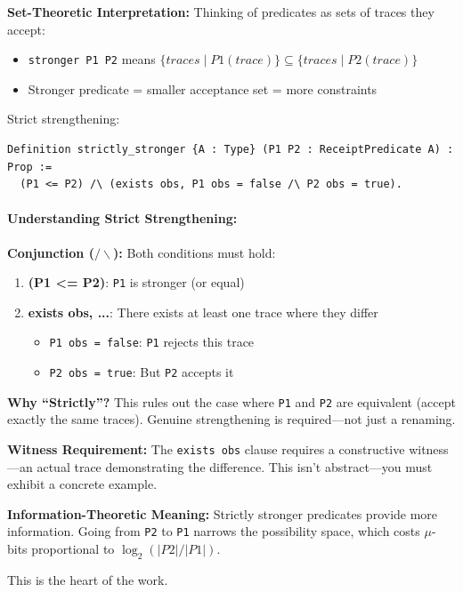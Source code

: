 \textbf{Set-Theoretic Interpretation:} Thinking of predicates as sets of traces they accept:
\begin{itemize}
    \item \texttt{stronger P1 P2} means $\{traces \mid P1(trace)\} \subseteq \{traces \mid P2(trace)\}$
    \item Stronger predicate = smaller acceptance set = more constraints
\end{itemize}

Strict strengthening:
\begin{lstlisting}
Definition strictly_stronger {A : Type} (P1 P2 : ReceiptPredicate A) : Prop :=
  (P1 <= P2) /\ (exists obs, P1 obs = false /\ P2 obs = true).
\end{lstlisting}

\paragraph{Understanding Strict Strengthening:}
\textbf{Conjunction ($/\backslash$):} Both conditions must hold:
\begin{enumerate}
    \item \textbf{(P1 <= P2)}: \texttt{P1} is stronger (or equal)
    \item \textbf{exists obs, ...}: There exists at least one trace where they differ
    \begin{itemize}
        \item \texttt{P1 obs = false}: \texttt{P1} rejects this trace
        \item \texttt{P2 obs = true}: But \texttt{P2} accepts it
    \end{itemize}
\end{enumerate}

\textbf{Why ``Strictly''?} This rules out the case where \texttt{P1} and \texttt{P2} are equivalent (accept exactly the same traces). Genuine strengthening is required---not just a renaming.

\textbf{Witness Requirement:} The \texttt{exists obs} clause requires a constructive witness—an actual trace demonstrating the difference. This isn't abstract—you must exhibit a concrete example.

\textbf{Information-Theoretic Meaning:} Strictly stronger predicates provide more information. Going from \texttt{P2} to \texttt{P1} narrows the possibility space, which costs $\mu$-bits proportional to $\log_2(|P2|/|P1|)$.

This is the heart of the work.

